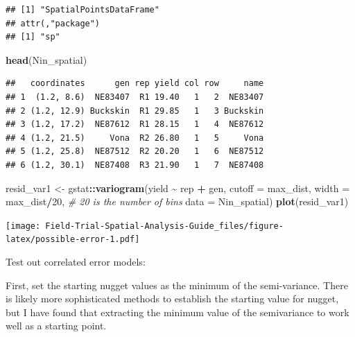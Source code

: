 \documentclass[
]{book}
\newenvironment{Shaded}{\begin{snugshade}}{\end{snugshade}}
\newcommand{\AttributeTok}[1]{\textcolor[rgb]{0.13,0.29,0.53}{#1}}
\newcommand{\CommentTok}[1]{\textcolor[rgb]{0.56,0.35,0.01}{\textit{#1}}}
\newcommand{\DecValTok}[1]{\textcolor[rgb]{0.00,0.00,0.81}{#1}}
\newcommand{\FunctionTok}[1]{\textcolor[rgb]{0.13,0.29,0.53}{\textbf{#1}}}
\newcommand{\NormalTok}[1]{#1}
\newcommand{\OtherTok}[1]{\textcolor[rgb]{0.56,0.35,0.01}{#1}}
\newcommand{\SpecialCharTok}[1]{\textcolor[rgb]{0.81,0.36,0.00}{\textbf{#1}}}
\begin{document}
\begin{verbatim}
## [1] "SpatialPointsDataFrame"
## attr(,"package")
## [1] "sp"
\end{verbatim}

\begin{Shaded}
\begin{Highlighting}[]
\FunctionTok{head}\NormalTok{(Nin\_spatial)}
\end{Highlighting}
\end{Shaded}

\begin{verbatim}
##   coordinates      gen rep yield col row     name
## 1  (1.2, 8.6)  NE83407  R1 19.40   1   2  NE83407
## 2 (1.2, 12.9) Buckskin  R1 29.85   1   3 Buckskin
## 3 (1.2, 17.2)  NE87612  R1 28.15   1   4  NE87612
## 4 (1.2, 21.5)     Vona  R2 26.80   1   5     Vona
## 5 (1.2, 25.8)  NE87512  R2 20.20   1   6  NE87512
## 6 (1.2, 30.1)  NE87408  R3 21.90   1   7  NE87408
\end{verbatim}

\begin{Shaded}
\begin{Highlighting}[]
\NormalTok{resid\_var1 }\OtherTok{\textless{}{-}}\NormalTok{ gstat}\SpecialCharTok{::}\FunctionTok{variogram}\NormalTok{(yield }\SpecialCharTok{\textasciitilde{}}\NormalTok{ rep }\SpecialCharTok{+}\NormalTok{ gen, }
                        \AttributeTok{cutoff =}\NormalTok{ max\_dist,}
                        \AttributeTok{width =}\NormalTok{ max\_dist}\SpecialCharTok{/}\DecValTok{20}\NormalTok{, }\CommentTok{\# 20 is the number of bins}
                        \AttributeTok{data =}\NormalTok{ Nin\_spatial)}
\FunctionTok{plot}\NormalTok{(resid\_var1)}
\end{Highlighting}
\end{Shaded}

\texttt{[image: Field-Trial-Spatial-Analysis-Guide\_files/figure-latex/possible-error-1.pdf]}

Test out correlated error models:

First, set the starting nugget values as the minimum of the semi-variance. There is likely more sophisticated methods to establish the starting value for nugget, but I have found that extracting the minimum value of the semivariance to work well as a starting point.

\begin{Shaded}
\end{Shaded}
\end{document}
